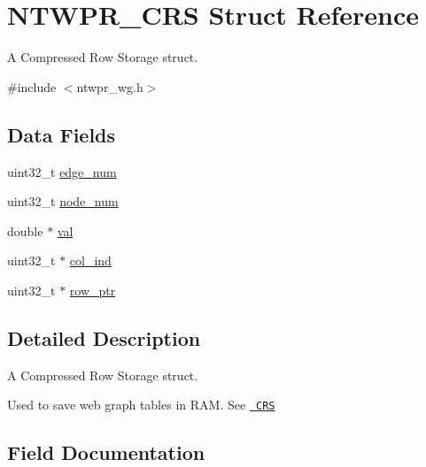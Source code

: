 \hypertarget{structNTWPR__CRS}{}\section{N\+T\+W\+P\+R\+\_\+\+C\+RS Struct Reference}
\label{structNTWPR__CRS}


A Compressed Row Storage struct.  




{\ttfamily \#include $<$ntwpr\+\_\+wg.\+h$>$}

\subsection*{Data Fields}
\begin{DoxyCompactItemize}
\item 
uint32\+\_\+t \mbox{\hyperlink{structNTWPR__CRS_a05685735e3e7157eb84471e95c14e994}{edge\+\_\+num}}
\item 
uint32\+\_\+t \mbox{\hyperlink{structNTWPR__CRS_a745bd86046682b8f2b96974389d4bae2}{node\+\_\+num}}
\item 
double $\ast$ \mbox{\hyperlink{structNTWPR__CRS_a2ed66783648d21a14b2729df178e0099}{val}}
\item 
uint32\+\_\+t $\ast$ \mbox{\hyperlink{structNTWPR__CRS_a93cf048b735d3757aae9345801ef15fa}{col\+\_\+ind}}
\item 
uint32\+\_\+t $\ast$ \mbox{\hyperlink{structNTWPR__CRS_a33e24ac0e5c91ebc8207447e13c8a636}{row\+\_\+ptr}}
\end{DoxyCompactItemize}


\subsection{Detailed Description}
A Compressed Row Storage struct. 

Used to save web graph tables in R\+AM. See \href{http://netlib.org/linalg/html_templates/node91.html#SECTION00931100000000000000}\texttt{ C\+RS} 

\subsection{Field Documentation}
\mbox{\label{structNTWPR__CRS_a93cf048b735d3757aae9345801ef15fa}} 
